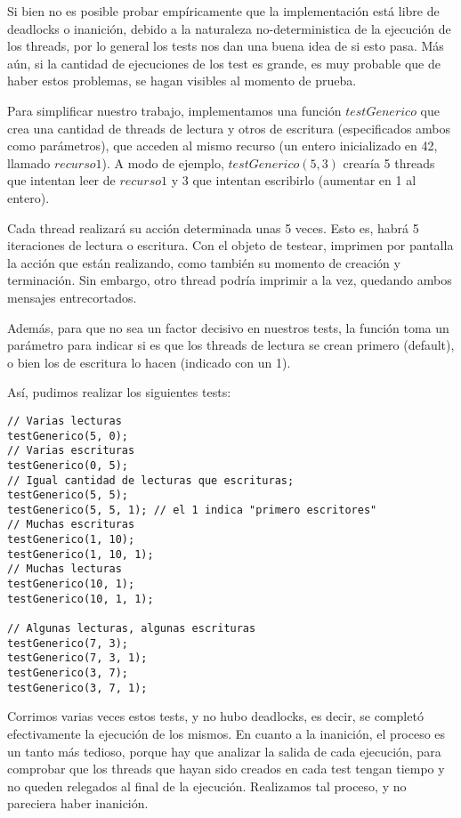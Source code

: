 Si bien no es posible probar empíricamente que la implementación está libre de deadlocks o inanición, debido a la naturaleza no-deterministica de la ejecución de los threads, por lo general los tests nos dan una buena idea de si esto pasa. Más aún, si la cantidad de ejecuciones de los test es grande, es muy probable que de haber estos problemas, se hagan visibles al momento de prueba. 

Para simplificar nuestro trabajo, implementamos una función $testGenerico$ que crea una cantidad de threads de lectura y otros de escritura (especificados ambos como parámetros), que acceden al mismo recurso (un entero inicializado en 42, llamado $recurso1$). A modo de ejemplo, $testGenerico(5, 3)$ crearía 5 threads que intentan leer de $recurso1$ y 3 que intentan escribirlo (aumentar en 1 al entero). 

Cada thread realizará su acción determinada unas 5 veces. Esto es, habrá 5 iteraciones de lectura o escritura. Con el objeto de testear, imprimen por pantalla la acción que están realizando, como también su momento de creación y terminación. Sin embargo, otro thread podría imprimir a la vez, quedando ambos mensajes entrecortados.

Además, para que no sea un factor decisivo en nuestros tests, la función toma un parámetro para indicar si es que los threads de lectura se crean primero (default), o bien los de escritura lo hacen (indicado con un 1). 

Así, pudimos realizar los siguientes tests: 

\begin{lstlisting}
// Varias lecturas
testGenerico(5, 0);
// Varias escrituras
testGenerico(0, 5);
// Igual cantidad de lecturas que escrituras;
testGenerico(5, 5);
testGenerico(5, 5, 1); // el 1 indica "primero escritores"
// Muchas escrituras
testGenerico(1, 10);
testGenerico(1, 10, 1);
// Muchas lecturas
testGenerico(10, 1);
testGenerico(10, 1, 1);

// Algunas lecturas, algunas escrituras
testGenerico(7, 3);
testGenerico(7, 3, 1);
testGenerico(3, 7);
testGenerico(3, 7, 1);
\end{lstlisting}

Corrimos varias veces estos tests, y no hubo deadlocks, es decir, se completó efectivamente la ejecución de los mismos. En cuanto a la inanición, el proceso es un tanto más tedioso, porque hay que analizar la salida de cada ejecución, para comprobar que los threads que hayan sido creados en cada test tengan tiempo y no queden relegados al final de la ejecución. Realizamos tal proceso, y no pareciera haber inanición.